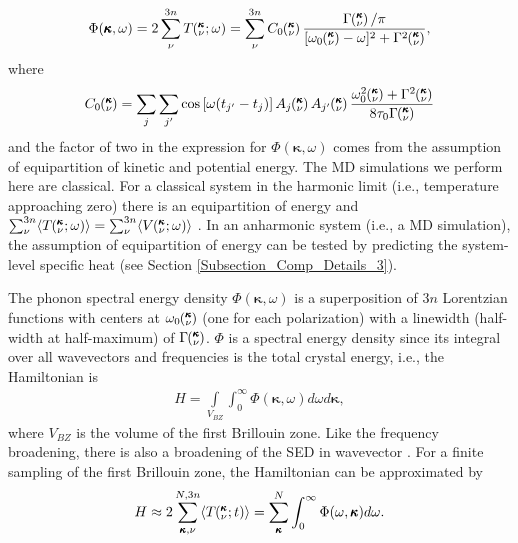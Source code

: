 \documentclass[12pt,twocolumn,iop]{/usr/share/texmf-texlive/tex/latex/iop/iopart}[/usr/share/texmf-texlive/tex/latex/iop/]
\newcommand{\kvt}{\mspace{-4.0mu}\left(\mspace{-8.0mu}\begin{smallmatrix}&\pmb{\kappa} \\&\nu\end{smallmatrix}\mspace{-2.0mu};t\right)}
\newcommand{\kvw}{\mspace{-4.0mu}\left(\mspace{-8.0mu}\begin{smallmatrix}&\pmb{\kappa} \\&\nu\end{smallmatrix}\mspace{-2.0mu};\omega\right)}
\newcommand{\kv}{\mspace{-4.0mu}\left(\mspace{-8.0mu}\begin{smallmatrix}&\pmb{\kappa} \\&\nu\end{smallmatrix}\mspace{-3.0mu}\right)}
\begin{document}
\begin{equation}\label{A:E:Lorentzian_NMD}
\begin{split}
\Phi(\pmb{\kappa},\omega) = 2\sum_{\nu}^{3n} T\kvw=\sum_{\nu}^{3n}C_0\kv\frac{\Gamma\kv/\pi}{[\omega_0\kv-\omega]^2+\Gamma^2\kv},
\end{split}
\end{equation}
where 
\begin{equation}\label{A:E:C_0}
\begin{split}
C_0\kv = \sum_j\sum_{j'}\cos\left[\omega (t_{j'}-t_j)\right]A_j\kv A_{j'}\kv\frac{\omega_0^2\kv+\Gamma^2\kv}{8\tau_0\Gamma\kv}
\end{split}
\end{equation}
and the factor of two in the expression for $\Phi(\pmb{\kappa},\omega)$  comes from the assumption of equipartition of kinetic and potential energy. The MD simulations we perform here are classical. For a classical system in the harmonic limit (i.e., temperature approaching zero) there is an equipartition of energy and $\sum_{\nu}^{3n} \langle T\kvw \rangle = \sum_{\nu}^{3n} \langle V\kvw \rangle$ \cite{mcquarrie2000}. In an anharmonic system (i.e., a MD simulation), the assumption of equipartition of energy can be tested by predicting the system-level specific heat (see Section \ref{Subsection_Comp_Details_3}). 

The phonon spectral energy density $\Phi(\pmb{\kappa},\omega)$ is a superposition of $3n$ Lorentzian
functions with centers at $\omega_0\kv$ (one for each polarization) with a linewidth (half-width at half-maximum) of
$\Gamma\kv$. $\Phi$ is a spectral energy density since its integral over all wavevectors and frequencies is the total crystal energy, i.e., the Hamiltonian is
\begin{equation}\label{A:E:equipartition}
\begin{split}
H=\int\limits_{V_{BZ}} \int_{0}^{\infty}\Phi(\pmb{\kappa},\omega)d\omega d\pmb{\kappa},
\end{split}
\end{equation}
where $V_{BZ}$ is the volume of the first Brillouin zone.  Like the frequency broadening, there is also a broadening of the SED in wavevector \cite{turneythesis}. For a finite sampling of the first Brillouin zone, the Hamiltonian can be approximated by
\begin{equation}\label{A:E:equipartition}
\begin{split}
H \approx 2\sum_{\pmb{\kappa},\nu}^{N,3n}\langle T\kvt\rangle = \sum_{\pmb{\kappa}}^N \int_{0}^{\infty}\Phi(\omega,\pmb{\kappa})d\omega.
\end{split}
\end{equation}
\end{document}
